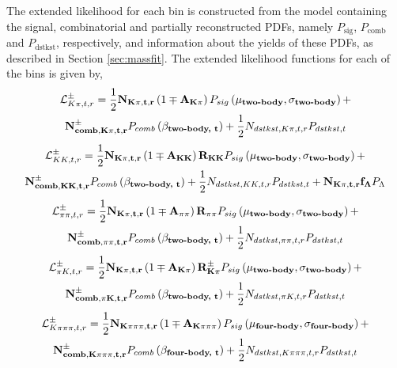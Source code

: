 The extended likelihood for each bin is constructed from the model containing the signal, combinatorial and partially reconstructed PDFs, namely $P_{\text{sig}}$, $P_{\text{comb}}$ and $P_{\text{dstkst}}$, respectively, and information about the yields of these PDFs, as described in Section \ref{sec:massfit}. The extended likelihood functions for each of the bins is given by,
\begin{multline}
\mathcal{L}_{K\pi, t, r}^{\pm} = \frac{1}{2}\mathbf{N_{K\pi, t, r}}\left(1 \mp \mathbf{A_{K\pi}}\right)P_{sig}\left(\mathbf{\mu_\text{\textbf{two-body}}},\mathbf{\sigma_\text{\textbf{two-body}}}\right) + \\ \mathbf{N_{comb, K\pi, t, r}^{\pm}}P_{comb}\left(\mathbf{\beta_\text{\textbf{two-body, t}}}\right) + \frac{1}{2}N_{dstkst, K\pi, t, r}P_{dstkst, t}
\label{kpilikelihood}
\end{multline}
\begin{multline}
\mathcal{L}_{KK, t, r}^{\pm} = \frac{1}{2}\mathbf{N_{K\pi, t, r}}\left(1 \mp \mathbf{A_{KK}}\right)\mathbf{R_{KK}} P_{sig}\left(\mathbf{\mu_\text{\textbf{two-body}}},\mathbf{\sigma_\text{\textbf{two-body}}}\right) + \\ \mathbf{N_{comb, KK, t, r}^{\pm}}P_{comb}\left(\mathbf{\beta_\text{\textbf{two-body, t}}}\right) + \frac{1}{2}N_{dstkst, KK, t, r}P_{dstkst, t} + \mathbf{N_{K\pi, t, r}}\mathbf{f_{\Lambda}}P_{\Lambda}
\end{multline}
\begin{multline}
\mathcal{L}_{\pi\pi, t, r}^{\pm} = \frac{1}{2}\mathbf{N_{K\pi, t, r}}\left(1 \mp \mathbf{A_{\pi\pi}}\right)\mathbf{R_{\pi\pi}} P_{sig}\left(\mathbf{\mu_\text{\textbf{two-body}}},\mathbf{\sigma_\text{\textbf{two-body}}}\right) + \\ \mathbf{N_{comb, \pi\pi, t, r}^{\pm}}P_{comb}\left(\mathbf{\beta_\text{\textbf{two-body, t}}}\right) + \frac{1}{2}N_{dstkst, \pi\pi, t, r}P_{dstkst, t}
\end{multline}
\begin{multline}
\mathcal{L}_{\pi K, t, r}^{\pm} = \frac{1}{2}\mathbf{N_{K\pi, t, r}}\left(1 \mp \mathbf{A_{K\pi}}\right)\mathbf{R_{K\pi}^{\pm}} P_{sig}\left(\mathbf{\mu_\text{\textbf{two-body}}},\mathbf{\sigma_\text{\textbf{two-body}}}\right) + \\ \mathbf{N_{comb, \pi K, t, r}^{\pm}}P_{comb}\left(\mathbf{\beta_\text{\textbf{two-body, t}}}\right) + \frac{1}{2}N_{dstkst, \pi K, t, r}P_{dstkst, t}
\end{multline}
\begin{multline}
\mathcal{L}_{K\pi\pi\pi, t, r}^{\pm} = \frac{1}{2}\mathbf{N_{K\pi\pi\pi, t, r}}\left(1 \mp \mathbf{A_{K\pi\pi\pi}}\right)P_{sig}\left(\mathbf{\mu_\text{\textbf{four-body}}},\mathbf{\sigma_\text{\textbf{four-body}}}\right) + \\ \mathbf{N_{comb, K\pi\pi\pi, t, r}^{\pm}}P_{comb}\left(\mathbf{\beta_\text{\textbf{four-body, t}}}\right) + \frac{1}{2}N_{dstkst, K\pi\pi\pi, t, r}P_{dstkst, t}
\end{multline}
